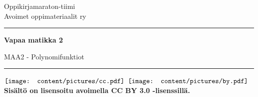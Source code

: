 
\begin{center}
    \begin{doublespace}
        \begin{LARGE}
            \textrm{Oppikirjamaraton-tiimi \\ Avoimet oppimateriaalit ry} \\
        \end{LARGE}
      
        \vspace{0.5cm}
        \hrule height 2pt
        \vspace{1cm}
        \begin{Huge}
            \textbf{\textrm{Vapaa matikka 2}}
        \end{Huge}
      
      
        \vfill
      
        \begin{huge}
            \textrm{MAA2 - Polynomifunktiot}
        \end{huge}
        \vspace{1cm}
        \hrule height 2pt
    \end{doublespace}
\end{center}

\vfill


\begin{flushright}
    $\vcenter{\hbox{\texttt{[image: content/pictures/cc.pdf]}}}$
    $\vcenter{\hbox{\texttt{[image: content/pictures/by.pdf]}}}$
    \textbf{Sisältö on lisensoitu avoimella CC BY 3.0 -lisenssillä.}
\end{flushright}
